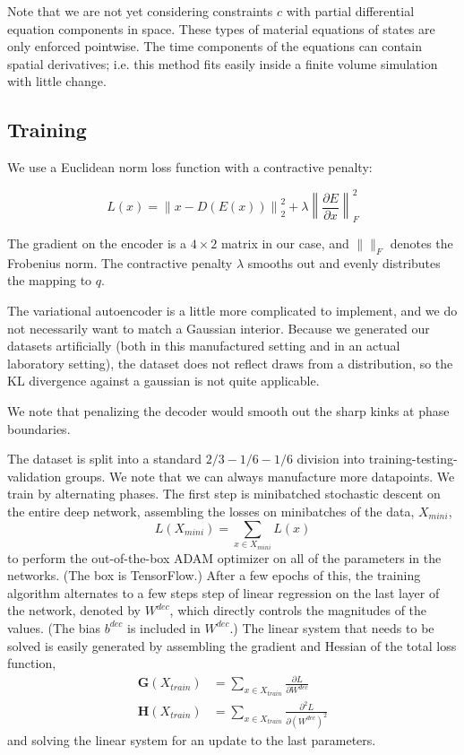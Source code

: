 \documentclass[]{article}
\begin{document}
Note that we are not yet considering constraints \(c\) with partial
differential equation components in space. These types of material
equations of states are only enforced pointwise. The time components of
the equations can contain spatial derivatives; i.e. this method fits
easily inside a finite volume simulation with little change.

\hypertarget{header-n3305}{%
\subsection{Training}\label{header-n3305}}

We use a Euclidean norm loss function with a contractive penalty:

\[L(x)=\left\|x-D(E(x))\right\|^2_2+\lambda\left\|\frac{\partial E}{\partial x}\right\|_F^2\]

The gradient on the encoder is a \(4\times2\) matrix in our case, and
\(\|\|_F\) denotes the Frobenius norm. The contractive penalty
\(\lambda\) smooths out and evenly distributes the mapping to \(q\).

The variational autoencoder is a little more complicated to implement,
and we do not necessarily want to match a Gaussian interior. Because we
generated our datasets artificially (both in this manufactured setting
and in an actual laboratory setting), the dataset does not reflect draws
from a distribution, so the KL divergence against a gaussian is not
quite applicable.

We note that penalizing the decoder would smooth out the sharp kinks at
phase boundaries.

The dataset is split into a standard $2/3-1/6-1/6$ division into
training-testing-validation groups. We note that we can always
manufacture more datapoints. We train by alternating phases. The first
step is minibatched stochastic descent on the entire deep network, assembling the losses on minibatches of the data, $X_{mini}$,
\begin{equation}
  L(X_{mini}) = \sum_{x\in X_{mini}} L(x)
  \end{equation}
to perform the out-of-the-box ADAM optimizer on all of the
parameters in the networks. (The box is
TensorFlow.) After a few epochs of this,
the training algorithm alternates to a few steps step of linear regression on the last layer of the network,
denoted by \(W^{dec}\), which directly controls the magnitudes of the values.
(The bias $b^{dec}$ is included in $W^{dec}$.) The linear
system that needs to be solved is easily generated by assembling the
gradient and Hessian of the total loss function,
\begin{align}
 \mathbf{G}\left(X_{train}\right) &= \sum_{x\in X_{train}}\frac{\partial L}{\partial W^{dec}} \\
\mathbf{H}\left(X_{train}\right) &= \sum_{x\in X_{train}}\frac{\partial^2 L}{\partial (W^{dec})^2}
\end{align}
and solving the linear system for an update to the last parameters.
\end{document}
